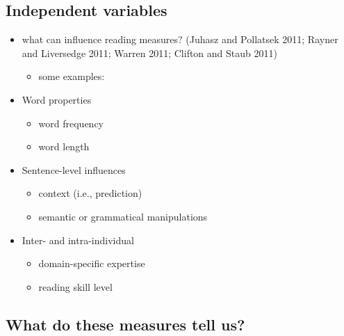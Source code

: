 \documentclass[
  letterpaper,
  DIV=11,
  numbers=noendperiod]{scrartcl}
\providecommand{\tightlist}{%
  \setlength{\itemsep}{0pt}\setlength{\parskip}{0pt}}\usepackage{longtable,booktabs,array}
\begin{document}
\hypertarget{independent-variables}{%
\subsection{Independent variables}\label{independent-variables}}

\begin{itemize}
\tightlist
\item
  what can influence reading measures? (Juhasz and Pollatsek 2011;
  Rayner and Liversedge 2011; Warren 2011; Clifton and Staub 2011)

  \begin{itemize}
  \tightlist
  \item
    some examples:
  \end{itemize}
\end{itemize}

\begin{itemize}
\tightlist
\item
  Word properties

  \begin{itemize}
  \tightlist
  \item
    word frequency
  \item
    word length
  \end{itemize}
\end{itemize}

\begin{itemize}
\tightlist
\item
  Sentence-level influences

  \begin{itemize}
  \tightlist
  \item
    context (i.e., prediction)
  \item
    semantic or grammatical manipulations
  \end{itemize}
\end{itemize}

\begin{itemize}
\tightlist
\item
  Inter- and intra-individual

  \begin{itemize}
  \tightlist
  \item
    domain-specific expertise
  \item
    reading skill level
  \end{itemize}
\end{itemize}

\hypertarget{what-do-these-measures-tell-us}{%
\subsection{What do these measures tell
us?}\label{what-do-these-measures-tell-us}}
\end{document}
